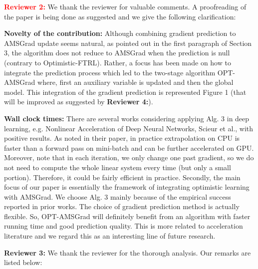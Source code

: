 \documentclass{article}
\begin{document}
\textbf{\textcolor{red}{Reviewer 2:}} We thank the reviewer for valuable comments. A proofreading of the paper is being done as suggested and we give the following clarification:\vspace{-5pt}

\textbf{Novelty of the contribution:} Although combining gradient prediction to AMSGrad update seems natural, as pointed out in the first paragraph of Section 3, the algorithm does not reduce to AMSGrad when the prediction is null (contrary to Optimistic-FTRL). 
Rather, a focus has been made on how to integrate the prediction process which led to the two-stage algorithm OPT-AMSGrad where, first an auxiliary variable is updated and then the global model. 
This integration of the gradient prediction is represented Figure 1 (that will be improved as suggested by \textbf{\textcolor{yellow!50!black}{Reviewer 4:}}).\vspace{-5pt}

\textbf{Wall clock times:}
There are several works considering applying Alg. 3 in deep learning, e.g. Nonlinear Acceleration of Deep Neural Networks, Scieur et al., with positive results. As noted in their paper, in practice extrapolation on CPU is faster than a forward pass on mini-batch and can be further accelerated on GPU. Moreover, note that in each iteration, we only change one past gradient, so we do not need to compute the whole linear system every time (but only a small portion).  Therefore, it could be fairly efficient in practice. Secondly, the main focus of our paper is essentially the framework of integrating optimistic learning with AMSGrad. We choose Alg. 3 mainly because of the empirical success reported in prior works. The choice of gradient prediction method is actually flexible. So, OPT-AMSGrad will definitely benefit from an algorithm with faster running time and good prediction quality. This is more related to acceleration literature and we regard this as an interesting line of future research.



\textbf{\textcolor{green!50!black}{Reviewer 3:}} We thank the reviewer for the thorough analysis. Our remarks are listed below:\vspace{-5pt}
\end{document}
